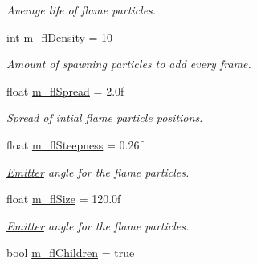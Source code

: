 \begin{DoxyCompactItemize}
\begin{DoxyCompactList}\small\item\em Average life of flame particles. \end{DoxyCompactList}\item 
\hypertarget{classEmitter_a56f401933d8c66a8355e9d3073041311}{int \hyperlink{classEmitter_a56f401933d8c66a8355e9d3073041311}{m\-\_\-fl\-Density} = 10}\label{classEmitter_a56f401933d8c66a8355e9d3073041311}

\begin{DoxyCompactList}\small\item\em Amount of spawning particles to add every frame. \end{DoxyCompactList}\item 
\hypertarget{classEmitter_a77f3919bf2449d9fe9ab2294d824a10b}{float \hyperlink{classEmitter_a77f3919bf2449d9fe9ab2294d824a10b}{m\-\_\-fl\-Spread} = 2.\-0f}\label{classEmitter_a77f3919bf2449d9fe9ab2294d824a10b}

\begin{DoxyCompactList}\small\item\em Spread of intial flame particle positions. \end{DoxyCompactList}\item 
\hypertarget{classEmitter_a254bbe70cc78563bc3e035eaa594c82d}{float \hyperlink{classEmitter_a254bbe70cc78563bc3e035eaa594c82d}{m\-\_\-fl\-Steepness} = 0.\-26f}\label{classEmitter_a254bbe70cc78563bc3e035eaa594c82d}

\begin{DoxyCompactList}\small\item\em \hyperlink{classEmitter}{Emitter} angle for the flame particles. \end{DoxyCompactList}\item 
\hypertarget{classEmitter_ab44f6794ae404bc2a6885f968241fa87}{float \hyperlink{classEmitter_ab44f6794ae404bc2a6885f968241fa87}{m\-\_\-fl\-Size} = 120.\-0f}\label{classEmitter_ab44f6794ae404bc2a6885f968241fa87}

\begin{DoxyCompactList}\small\item\em \hyperlink{classEmitter}{Emitter} angle for the flame particles. \end{DoxyCompactList}\item 
\hypertarget{classEmitter_aad0ffc2fadafa73475b9310ef57822f3}{bool \hyperlink{classEmitter_aad0ffc2fadafa73475b9310ef57822f3}{m\-\_\-fl\-Children} = true}\label{classEmitter_aad0ffc2fadafa73475b9310ef57822f3}


\end{DoxyCompactItemize}
